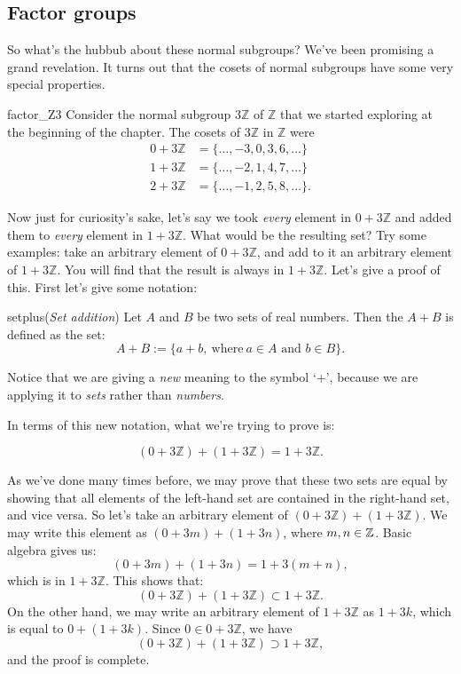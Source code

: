 \subsection{Factor groups}
\label{subsec:Cosets:NormalSubAndFactorGroup:FactorGroup}
 
So what's the hubbub about these normal subgroups?  We've been promising a grand revelation.  It turns out that the cosets of normal subgroups have some very special properties.

\begin{example}{factor_Z3}
Consider the normal subgroup $3 {\mathbb Z}$ of ${\mathbb Z}$ that we started exploring at the beginning of the chapter. The cosets of
$3 {\mathbb Z}$ in ${\mathbb Z}$ were
\begin{align*}
0 + 3 {\mathbb Z} & = \{ \ldots, -3, 0, 3, 6, \ldots \} \\
1 + 3 {\mathbb Z} & = \{ \ldots, -2, 1, 4, 7, \ldots \} \\
2 + 3 {\mathbb Z} & = \{ \ldots, -1, 2, 5, 8, \ldots \}.
\end{align*}

Now just for curiosity's sake, let's say we took \emph{every} element in $0 + 3 {\mathbb Z}$ and added them to \emph{every} element in $1 + 3 {\mathbb Z}$.  What would be the resulting set?  Try some examples: take an arbitrary element of $0 + 3 {\mathbb Z}$, and add to it an arbitrary element of $1 + 3 {\mathbb Z}$. You will find that the result is always in $1 + 3 {\mathbb Z}$. Let's give a proof of this. First let's give some notation:

\begin{defn}{setplus}(\emph{Set addition})  Let $A$ and $B$ be two sets of real numbers.  Then the  $A + B$ is defined as the set:
\[ A + B := \{a + b, \mathrm{~where~} a \in A \text{ and } b \in B\} .\]
\end{defn}
\noindent
Notice that we are giving a \emph{new} meaning to the symbol `+', because we are applying it to \emph{sets} rather than \emph{numbers}. 

In terms of this new notation, what we're trying to prove is:

\[ (0 + 3 {\mathbb Z}) + (1 + 3 {\mathbb Z}) = 1 + 3 {\mathbb Z}. \]

As we've done many times before, we may prove that these two sets are equal by showing that all elements of the left-hand set are contained in the right-hand set, and vice versa. So let's take an arbitrary element of $(0 + 3 {\mathbb Z}) + (1 + 3 {\mathbb Z})$. We may write this element as $(0 + 3m) + (1 + 3n)$, where $m,n \in \mathbb{Z}$. Basic algebra gives us:
\[(0 + 3m) + (1 + 3 n) = 1 + 3(m+ n), \]
which is in $1 + 3 {\mathbb Z}$. This shows that: 
\[ (0 + 3 {\mathbb Z}) + (1 + 3 {\mathbb Z}) \subset 1 + 3 {\mathbb Z}. \]
On the other hand, we may write an arbitrary element of $1 + 3 {\mathbb Z}$ as $1 + 3k$, which is equal to  $0 + (1 + 3k)$.  Since $0 \in 0 + 3 {\mathbb Z}$, we have 
\[ (0 + 3 {\mathbb Z}) + (1 + 3 {\mathbb Z}) \supset 1 + 3 {\mathbb Z}, \]
and the proof is complete.


\end{example}
